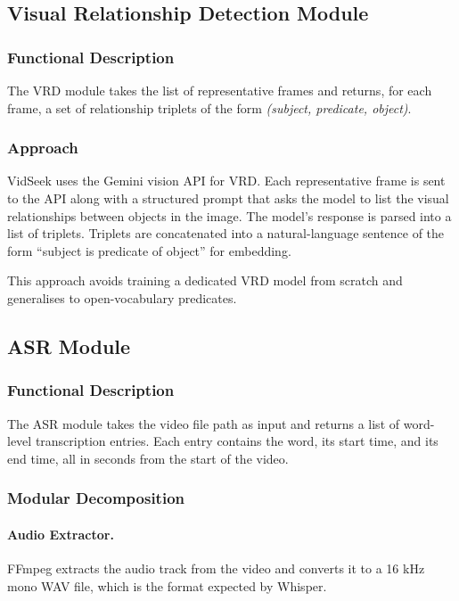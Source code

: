 \documentclass[12pt, a4paper]{report}
\begin{document}
\subsection{Visual Relationship Detection Module}

\subsubsection{Functional Description}

The VRD module takes the list of representative frames and returns, for
each frame, a set of relationship triplets of the form
\textit{(subject, predicate, object)}.

\subsubsection{Approach}

VidSeek uses the Gemini vision API for VRD. Each representative frame is
sent to the API along with a structured prompt that asks the model to list
the visual relationships between objects in the image. The model's response
is parsed into a list of triplets. Triplets are concatenated into a natural-language
sentence of the form ``subject is predicate of object'' for embedding.

This approach avoids training a dedicated VRD model from scratch and
generalises to open-vocabulary predicates.

\subsection{ASR Module}

\subsubsection{Functional Description}

The ASR module takes the video file path as input and returns a list of
word-level transcription entries. Each entry contains the word, its start
time, and its end time, all in seconds from the start of the video.

\subsubsection{Modular Decomposition}

\paragraph{Audio Extractor.}
FFmpeg extracts the audio track from the video and converts it to a 16 kHz
mono WAV file, which is the format expected by Whisper.
\end{document}
